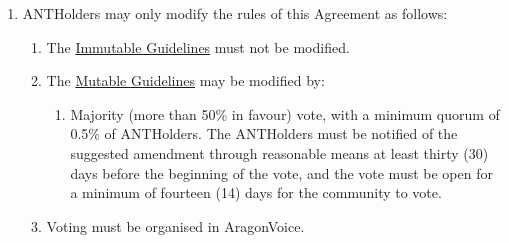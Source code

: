 \begin{enumerate}
\begin{enumerate}
		\begin{enumerate}
			\item \glspl{ANTHolder} may only modify the rules of this Agreement as follows:
			\begin{enumerate}
				\item The \hyperref[sec:ImmutableGuidelines]{Immutable Guidelines} must not be modified.
				\item The \hyperref[sec:MutableGuidelines]{Mutable Guidelines} may be modified by:
				\begin{enumerate}
					\item Majority (more than 50\% in favour) vote, with a minimum quorum of 0.5\% of \glspl{ANTHolder}. The \glspl{ANTHolder} must be notified of the suggested amendment through reasonable means at least thirty (30) days before the beginning of the vote, and the vote must be open for a minimum of fourteen (14) days for the community to vote.
				\end{enumerate}
				\item  Voting must be organised in \gls{AragonVoice}.
			\end{enumerate}
		\end{enumerate}
	
	\end{enumerate}
\end{enumerate}
